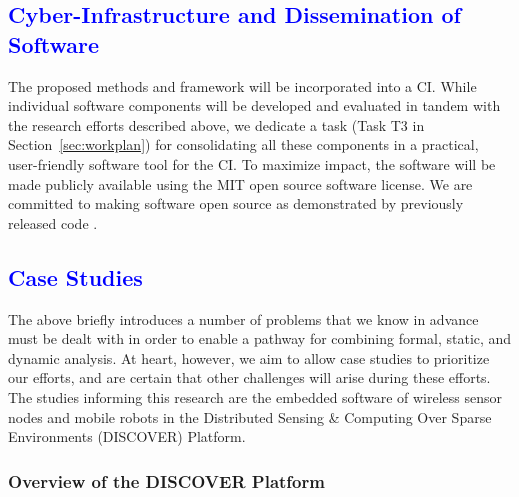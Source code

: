 

\subsection{\textcolor{blue}{Cyber-Infrastructure and Dissemination of Software}}
\label{sec:software}

The proposed methods and framework will be incorporated into a CI.
While individual software components will be developed and evaluated in tandem with the research efforts described above, we dedicate a task (Task T3 in Section~\ref{sec:workplan}) for consolidating all these components in a practical, user-friendly software tool for the CI.
To maximize impact, the software will be made publicly available %
using the MIT open source software license.
We are committed to making software open source as demonstrated by previously released %
code \cite{mleplussoftware, bernalMLEToolIntegrated2012a, openbuildnetsoftware, nghiemOpenBuildNetFrameworkDistributed2016}.


\subsection{\textcolor{blue}{Case Studies}} %
\label{sec:case-study}

The above briefly introduces a number of problems that we know in advance must
be dealt with in order to enable a pathway for combining formal,
static, and dynamic analysis.    At heart, however, we aim to allow
case studies to prioritize our efforts, and
are certain that other challenges will arise during these efforts.
The studies informing this research are the embedded software of %
wireless sensor nodes and mobile robots in the Distributed Sensing \& Computing Over Sparse Environments (DISCOVER) Platform.

\subsubsection{Overview of the DISCOVER Platform}
\label{sec:cast-study:discover}

